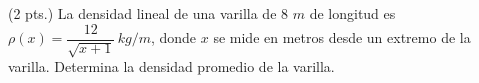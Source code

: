 \documentclass[12pt]{exam}
\begin{document}
\begin{questions}
\question  (2 pts.) La densidad lineal de una varilla de 8 $m$ de longitud es $\rho(x)=\dfrac{12}{\sqrt{x+1}} \, kg/m$, donde $x$ se mide en metros desde un extremo de la varilla. Determina la densidad promedio de la varilla. 


    
        \end{questions}
        \vskip30pt
 \RaggedRight
     
    \newpage



\pagestyle{foot}    %
\end{document}
